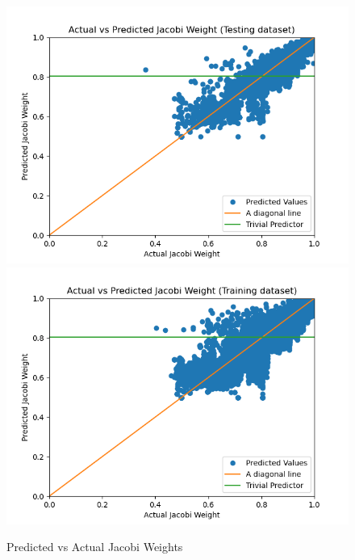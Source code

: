 \begin{figure}[h]
  \centering
  \includegraphics[scale=0.7]{figures/jacobi-conv/jacobi_test_pred.png}
  \includegraphics[scale=0.7]{figures/jacobi-conv/jacobi_train_pred.png}
  \caption{Predicted vs Actual Jacobi Weights}
  \label{fig:jacobi_preds}
\end{figure}

